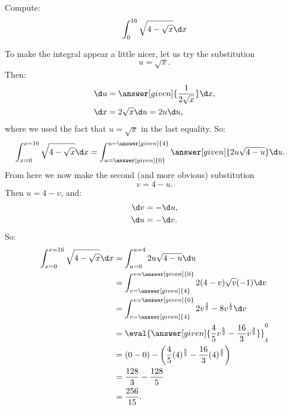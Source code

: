 \documentclass[nooutcomes]{ximera}
\begin{document}
\begin{example}
Compute:
\[
\int_0^{16} \sqrt{4 - \sqrt{x}} \d x
\]
\begin{explanation}
To make the integral appear a little nicer, let us try the substitution
\[
u = \sqrt{x}.
\]
Then:
\begin{align*}
\d u &= \answer[given]{\frac{1}{2 \sqrt{x}}} \d x,\\
\d x &= 2 \sqrt{x} \d u = 2u \d u,
\end{align*}
where we used the fact that $u=\sqrt{x}$ in the last equality.  So:
\begin{align*}
\int_{x=0}^{x=16} \sqrt{4 - \sqrt{x}} \d x &=  \int_{u=\answer[given]{0}}^{u=\answer[given]{4}} \answer[given]{2u \sqrt{4-u}} \d u.
\end{align*}
From here we now make the second (and more obvious) substitution
\[
v = 4-u.
\]
Then $u = 4-v$, and: 
\begin{align*}
\d v &= - \d u,\\
\d u &= - \d v.
\end{align*}
So:
\begin{align*}
\int_{x=0}^{x=16} \sqrt{4 - \sqrt{x}} \d x &= \int_{u=0}^{u=4} 2u \sqrt{4-u} \d u  \\
&= \int_{v=\answer[given]{4}}^{v=\answer[given]{0}} 2 (4-v) \sqrt{v} (-1) \d v  \\
&= \int_{v=\answer[given]{4}}^{v=\answer[given]{0}} 2v^{\frac{3}{2}} - 8v^{\frac{1}{2}}  \d v  \\
&= \eval{ \answer[given]{  \frac{4}{5} v^{\frac{5}{2}} -  \frac{16}{3} v^{\frac{3}{2}} }}_{4}^{0}  \\
&=  \left( 0 - 0 \right) - \left(\frac{4}{5} (4)^{\frac{5}{2}} - \frac{16}{3} (4)^{\frac{3}{2}}  \right)   \\
&= \frac{128}{3} - \frac{128}{5}   \\
&= \frac{256}{15}.
\end{align*}
\end{explanation}
\end{example}



\end{document}
